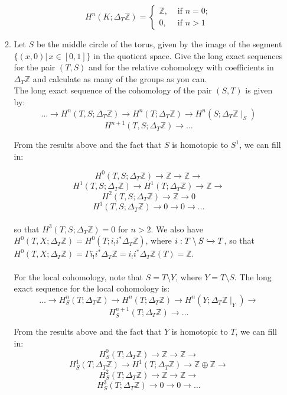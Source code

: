 \documentclass{article}
\newcommand{\zed}{\mathbb Z}
\begin{document}
\begin{enumerate}
\begin{enumerate}
\[H^n(K; \Delta_T\mathbb{Z}) = \begin{cases} 
\mathbb{Z}, & \text{ if } n=0; \\
0, & \text{ if } n >1 
\end{cases}
\]

\item
Let $S$ be the middle circle of the torus, given by the image of the segment $\{(x,0)|\,x\in[0,1]\}$ in the quotient space. Give the long exact sequences for the pair $(T,S)$ 
and for the relative cohomology with coefficients in $\Delta_T\zed$ and calculate as many of the groups as you can.\\

The long exact sequence of the cohomology of the pair $(S,T)$ is given by:
\[\ldots \rightarrow H^n(T,S; \Delta_T\mathbb{Z}) \rightarrow H^n (T; \Delta_T\mathbb{Z}) \rightarrow H^n(S; \Delta_T\mathbb{Z}\mid_S)\]
\[H^{n+1}(T, S;\Delta_T\mathbb{Z}) \rightarrow \ldots \]

From the results above and the fact that $S$ is homotopic to $S^1$, we can fill in:

\[H^0(T,S; \Delta_T\mathbb{Z}) \rightarrow \mathbb{Z} \rightarrow \mathbb{Z} \rightarrow \]
\[H^1(T,S; \Delta_T\mathbb{Z}) \rightarrow H^1(T; \Delta_T\mathbb{Z}) \rightarrow \mathbb{Z} \rightarrow \]
\[ H^2(T,S; \Delta_T\mathbb{Z}) \rightarrow \mathbb{Z} \rightarrow 0\]
\[ H^3(T,S; \Delta_T\mathbb{Z}) \rightarrow 0 \rightarrow 0 \rightarrow \ldots\]\\

so that $H^3(T,S; \Delta_T\mathbb{Z}) =0$ for $n >2$. We also have $H^0(T, X;\Delta_T\mathbb{Z}) = H^0(T; i_!i^*\Delta_T\mathbb{Z})$, where $i: T \setminus S \xhookrightarrow[]{} T$, so that $H^0(T, X;\Delta_T\mathbb{Z}) = \Gamma i_!i^*\Delta_T\mathbb{Z} = i_!i^*\Delta_T\mathbb{Z}(T)=\mathbb{Z}$.\\\\

For the local cohomology, note that $S = T \setminus Y$, where $Y = T \setminus S$. The long exact sequence for the local cohomology is:
\[\ldots \rightarrow H^n_S(T;\Delta_T\mathbb{Z}) \rightarrow H^n(T;\Delta_T\mathbb{Z}) \rightarrow H^n(Y; \Delta_T\mathbb{Z}\mid_Y) \rightarrow  \]
\[H^{n+1}_S(T;\Delta_T\mathbb{Z}) \rightarrow \ldots \]

From the results above and the fact that $Y$ is homotopic to $T$, we can fill in:
\[H^0_S(T;\Delta_T\mathbb{Z}) \rightarrow \mathbb{Z} \rightarrow \mathbb{Z} \rightarrow  \]
\[ H^1_S(T;\Delta_T\mathbb{Z}) \rightarrow H^1(T;\Delta_T\mathbb{Z}) \rightarrow \mathbb{Z} \oplus \mathbb{Z} \rightarrow  \]
\[ H^2_S(T;\Delta_T\mathbb{Z}) \rightarrow \mathbb{Z} \rightarrow \mathbb{Z} \rightarrow  \]
\[H^3_S(T;\Delta_T\mathbb{Z}) \rightarrow 0 \rightarrow 0 \rightarrow \ldots \]\\


\end{enumerate}
\end{enumerate}
\end{document}
